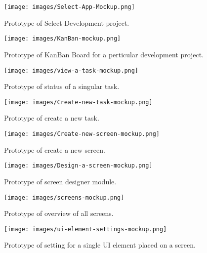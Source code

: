 \begin{figure}[H]
    \texttt{[image: images/Select-App-Mockup.png]}
    \caption{Prototype of Select Development project.}
\end{figure}

\begin{figure}[H]
    \texttt{[image: images/KanBan-mockup.png]}
    \caption{Prototype of KanBan Board for a perticular development project.}
\end{figure}

\begin{figure}[H]
    \texttt{[image: images/view-a-task-mockup.png]}
    \caption{Prototype of status of a singular task.}
\end{figure}

\begin{figure}[H]
    \texttt{[image: images/Create-new-task-mockup.png]}
    \caption{Prototype of create a new task.}
\end{figure}

\begin{figure}[H]
    \texttt{[image: images/Create-new-screen-mockup.png]}
    \caption{Prototype of create a new screen.}
\end{figure}

\begin{figure}[H]
    \texttt{[image: images/Design-a-screen-mockup.png]}
    \caption{Prototype of screen designer module.}
\end{figure}

\begin{figure}[H]
    \texttt{[image: images/screens-mockup.png]}
    \caption{Prototype of overview of all screens.}
\end{figure}

\begin{figure}[H]
    \texttt{[image: images/ui-element-settings-mockup.png]}
    \caption{Prototype of setting for a single UI element placed on a screen.}
\end{figure}
